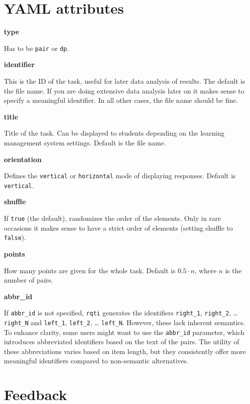 \documentclass[twoside]{tufte-book}
\begin{document}
\section{YAML attributes}\label{YAML-attributes-6}

\noindent\textbf{type}\label{type-6}

Has to be \texttt{pair} or \texttt{dp}.

\noindent\textbf{identifier}\label{identifier-6}

This is the ID of the task, useful for later data analysis of results. The default is the file name. If you are doing extensive data analysis later on it makes sense to
specify a meaningful identifier. In all other cases, the file name should be
fine.

\noindent\textbf{title}\label{title-6}

Title of the task. Can be displayed to students depending on
the learning management system settings. Default is the file name.

\noindent\textbf{orientation}\label{orientation-2}

Defines the \texttt{vertical} or \texttt{horizontal} mode of displaying responses. Default is \texttt{vertical}.

\noindent\textbf{shuffle}\label{shuffle-3}

If \texttt{true} (the default), randomizes the order of the elements. Only in rare occasions it makes sense to have a strict order of elements (setting shuffle to \texttt{false}).

\noindent\textbf{points}\label{points-7}

How many points are given for the whole task. Default is \(0.5\cdot n\), where \(n\) is the number of pairs.

\noindent\textbf{abbr\_id}\label{abbr_id}

If \texttt{abbr\_id} is not specified, \texttt{rqti} generates the identifiers \texttt{right\_1}, \texttt{right\_2}, \ldots{} \texttt{right\_N} and \texttt{left\_1}, \texttt{left\_2}, \ldots{} \texttt{left\_N}. However, these lack inherent semantics. To enhance clarity, some users might want to use the \texttt{abbr\_id} parameter, which introduces abbreviated identifiers based on the text of the pairs. The utility of these abbreviations varies based on item length, but they consistently offer more meaningful identifiers compared to non-semantic alternatives.

\section{Feedback}\label{feedback-6}
\end{document}
